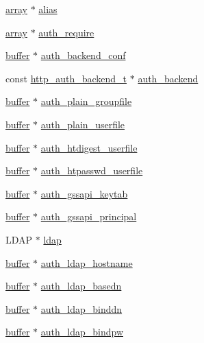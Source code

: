 \begin{DoxyCompactItemize}
\item 
\hyperlink{structarray}{array} $\ast$ \hyperlink{structplugin__config_a54b001d895399c170c3911957611c797}{alias}
\item 
\hyperlink{structarray}{array} $\ast$ \hyperlink{structplugin__config_a5e969ea12a2d4e00062852d22b1e33a2}{auth\-\_\-require}
\item 
\hyperlink{structbuffer}{buffer} $\ast$ \hyperlink{structplugin__config_ad45ad20cd63f95db8fddec6d0a3acda5}{auth\-\_\-backend\-\_\-conf}
\item 
const \hyperlink{structhttp__auth__backend__t}{http\-\_\-auth\-\_\-backend\-\_\-t} $\ast$ \hyperlink{structplugin__config_a0196a06e85c1f546d24c0c131a651ba4}{auth\-\_\-backend}
\item 
\hyperlink{structbuffer}{buffer} $\ast$ \hyperlink{structplugin__config_a7f4d7b466ffa9ac5635a79d182e4bbd9}{auth\-\_\-plain\-\_\-groupfile}
\item 
\hyperlink{structbuffer}{buffer} $\ast$ \hyperlink{structplugin__config_aca323cf277c3136664e394c046ed33d6}{auth\-\_\-plain\-\_\-userfile}
\item 
\hyperlink{structbuffer}{buffer} $\ast$ \hyperlink{structplugin__config_a8f77e857c7b525ce42e3a87b047eef5a}{auth\-\_\-htdigest\-\_\-userfile}
\item 
\hyperlink{structbuffer}{buffer} $\ast$ \hyperlink{structplugin__config_a5913215a08368ee9f6e876bf0dcb034a}{auth\-\_\-htpasswd\-\_\-userfile}
\item 
\hyperlink{structbuffer}{buffer} $\ast$ \hyperlink{structplugin__config_a8eccf296fad2aa78e270ad22815623d2}{auth\-\_\-gssapi\-\_\-keytab}
\item 
\hyperlink{structbuffer}{buffer} $\ast$ \hyperlink{structplugin__config_aadd7e5a63fa100286364a492dee7db89}{auth\-\_\-gssapi\-\_\-principal}
\item 
L\-D\-A\-P $\ast$ \hyperlink{structplugin__config_aa5819e1b912413153b89a06e14da0f00}{ldap}
\item 
\hyperlink{structbuffer}{buffer} $\ast$ \hyperlink{structplugin__config_a5770827001932ccf2ba8568701f9cc18}{auth\-\_\-ldap\-\_\-hostname}
\item 
\hyperlink{structbuffer}{buffer} $\ast$ \hyperlink{structplugin__config_a1f4fae4ce75b39a02e476aafaa468465}{auth\-\_\-ldap\-\_\-basedn}
\item 
\hyperlink{structbuffer}{buffer} $\ast$ \hyperlink{structplugin__config_a0c4f44a8422dea547c77d190b4d50e02}{auth\-\_\-ldap\-\_\-binddn}
\item 
\hyperlink{structbuffer}{buffer} $\ast$ \hyperlink{structplugin__config_aa0a3061a07781bb55d7a63b24a2dfc9c}{auth\-\_\-ldap\-\_\-bindpw}

\end{DoxyCompactItemize}
